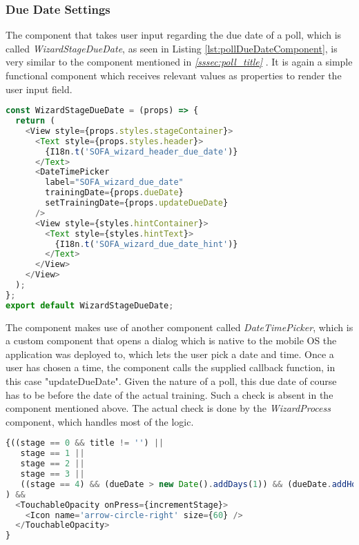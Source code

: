\subsubsection{Due Date Settings}
\label{sssec:poll_due_date}

The component that takes user input regarding the due date of a poll, which is called \textit{WizardStageDueDate}, as seen in Listing \ref{lst:pollDueDateComponent}, is very similar to the component mentioned in \textit{\ref{sssec:poll_title} }. It is again a simple functional component which receives relevant values as properties to render the user input field.

\begin{lstlisting}[language=javascript,caption=Simplified Poll Due Date Component,label=lst:pollDueDateComponent]
const WizardStageDueDate = (props) => {
  return (
    <View style={props.styles.stageContainer}>
      <Text style={props.styles.header}>
        {I18n.t('SOFA_wizard_header_due_date')}
      </Text>
      <DateTimePicker
        label="SOFA_wizard_due_date"
        trainingDate={props.dueDate}
        setTrainingDate={props.updateDueDate}
      />
      <View style={styles.hintContainer}>
        <Text style={styles.hintText}>
          {I18n.t('SOFA_wizard_due_date_hint')}
        </Text>
      </View>
    </View>
  );
};
export default WizardStageDueDate;
\end{lstlisting}

The component makes use of another component called \textit{DateTimePicker}, which is a custom component that opens a dialog which is native to the mobile OS the application was deployed to, which lets the user pick a date and time. Once a user has chosen a time, the component calls the supplied callback function, in this case "updateDueDate".
\newline
Given the nature of a poll, this due date of course has to be before the date of the actual training. Such a check is absent in the component mentioned above. The actual check is done by the \textit{WizardProcess} component, which handles most of the logic.

\begin{lstlisting}[language=javascript,caption=Increment Stage Check,label=lst:incrementStageCheck]
{((stage == 0 && title != '') ||
   stage == 1 ||
   stage == 2 ||
   stage == 3 ||
   ((stage == 4) && (dueDate > new Date().addDays(1)) && (dueDate.addHours(2) < trainingDate))
) &&
  <TouchableOpacity onPress={incrementStage}>
    <Icon name='arrow-circle-right' size={60} />
  </TouchableOpacity>
}
\end{lstlisting}

